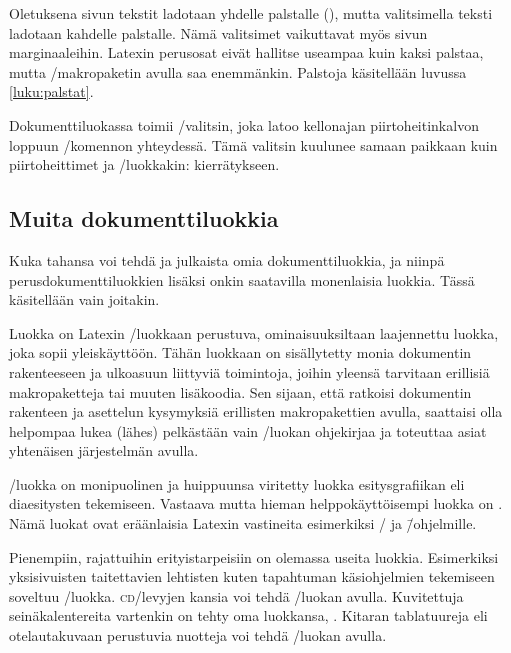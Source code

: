 Oletuksena%
 sivun tekstit ladotaan yhdelle
palstalle (), mutta valitsimella 
teksti ladotaan kahdelle palstalle. Nämä valitsimet vaikuttavat myös
sivun marginaaleihin. Latexin perusosat eivät hallitse useampaa kuin
kaksi palstaa, mutta \-/makropaketin avulla saa
enemmänkin. Palstoja käsitellään luvussa \ref{luku:palstat}.

Dokumenttiluokassa%
  toimii \-/valitsin, joka
latoo kellon\-ajan piirtoheitinkalvon loppuun \-/komennon yhteydessä. Tämä valitsin kuulunee samaan paikkaan
kuin piirtoheittimet ja \-/luokkakin: kierrätykseen.

\subsection{Muita dokumenttiluokkia}

Kuka tahansa voi tehdä ja julkaista omia dokumenttiluokkia, ja niinpä
perusdokumenttiluokkien lisäksi onkin saatavilla monenlaisia luokkia.
Tässä käsitellään vain joitakin.

Luokka%
  on Latexin \-/luokkaan
perustuva, ominaisuuksiltaan laajennettu luokka, joka sopii
yleiskäyttöön. Tähän luokkaan on sisällytetty monia dokumentin
rakenteeseen ja ulkoasuun liittyviä toimintoja, joihin yleensä tarvitaan
erillisiä makropaketteja tai muuten lisäkoodia. Sen sijaan, että
ratkoisi dokumentin rakenteen ja asettelun kysymyksiä erillisten
makropakettien avulla, saattaisi olla helpompaa lukea (lähes) pelkästään
vain \-/luokan ohjekirjaa ja toteuttaa asiat yhtenäisen
järjestelmän avulla.

\-/luokka%
 on monipuolinen ja huippuunsa viritetty luokka
esi\-tys\-gra\-fii\-kan eli dia\-esi\-tys\-ten tekemiseen. Vastaava
mutta hieman helppokäyttöisempi luokka on 
. Nämä luokat ovat eräänlaisia Latexin vastineita
esimerkiksi \-/{} ja  \=/ohjelmille.

Pienempiin, rajattuihin erityistarpeisiin on olemassa useita luokkia.
Esimerkiksi yksisivuisten taitettavien lehtisten kuten tapahtuman
käsi\-ohjel\-mien tekemiseen soveltuu 
\-/luokka. \textsc{cd}\-/levyjen kansia voi tehdä
 \-/luokan avulla. Kuvitettuja
seinäkalentereita vartenkin on tehty oma luokkansa,
 . Kitaran
tablatuureja eli otelautakuvaan perustuvia nuotteja voi tehdä
 \-/luokan avulla.

